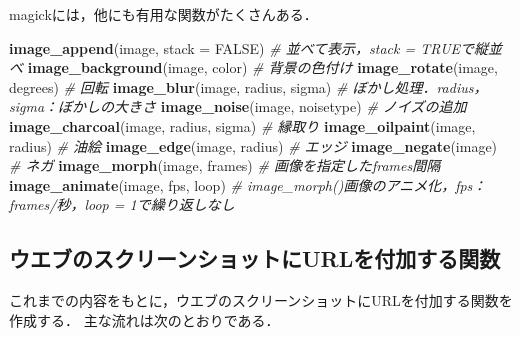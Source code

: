 \documentclass[
]{article}
\newenvironment{Shaded}{\begin{snugshade}}{\end{snugshade}}
\newcommand{\AttributeTok}[1]{\textcolor[rgb]{0.13,0.29,0.53}{#1}}
\newcommand{\CommentTok}[1]{\textcolor[rgb]{0.56,0.35,0.01}{\textit{#1}}}
\newcommand{\ConstantTok}[1]{\textcolor[rgb]{0.56,0.35,0.01}{#1}}
\newcommand{\FunctionTok}[1]{\textcolor[rgb]{0.13,0.29,0.53}{\textbf{#1}}}
\newcommand{\NormalTok}[1]{#1}
\begin{document}
magickには，他にも有用な関数がたくさんある．

\begin{Shaded}
\begin{Highlighting}[]
\FunctionTok{image\_append}\NormalTok{(image, }\AttributeTok{stack =} \ConstantTok{FALSE}\NormalTok{)   }\CommentTok{\# 並べて表示，stack = TRUEで縦並べ}
\FunctionTok{image\_background}\NormalTok{(image, color)       }\CommentTok{\# 背景の色付け}
\FunctionTok{image\_rotate}\NormalTok{(image, degrees)         }\CommentTok{\# 回転}
\FunctionTok{image\_blur}\NormalTok{(image, radius, sigma)     }\CommentTok{\# ぼかし処理．radius，sigma：ぼかしの大きさ}
\FunctionTok{image\_noise}\NormalTok{(image, noisetype)        }\CommentTok{\# ノイズの追加}
\FunctionTok{image\_charcoal}\NormalTok{(image, radius, sigma) }\CommentTok{\# 縁取り}
\FunctionTok{image\_oilpaint}\NormalTok{(image, radius)        }\CommentTok{\# 油絵}
\FunctionTok{image\_edge}\NormalTok{(image, radius)            }\CommentTok{\# エッジ}
\FunctionTok{image\_negate}\NormalTok{(image)                  }\CommentTok{\# ネガ}
\FunctionTok{image\_morph}\NormalTok{(image, frames)           }\CommentTok{\# 画像を指定したframes間隔}
\FunctionTok{image\_animate}\NormalTok{(image, fps, loop)      }\CommentTok{\# image\_morph()画像のアニメ化，fps：frames/秒，\textasciigrave{}loop = 1\textasciigrave{}で繰り返しなし}
\end{Highlighting}
\end{Shaded}

\hypertarget{ux30a6ux30a8ux30d6ux306eux30b9ux30afux30eaux30fcux30f3ux30b7ux30e7ux30c3ux30c8ux306burlux3092ux4ed8ux52a0ux3059ux308bux95a2ux6570}{%
\subsection{ウエブのスクリーンショットにURLを付加する関数}\label{ux30a6ux30a8ux30d6ux306eux30b9ux30afux30eaux30fcux30f3ux30b7ux30e7ux30c3ux30c8ux306burlux3092ux4ed8ux52a0ux3059ux308bux95a2ux6570}}

これまでの内容をもとに，ウエブのスクリーンショットにURLを付加する関数を作成する．
主な流れは次のとおりである．
\end{document}
